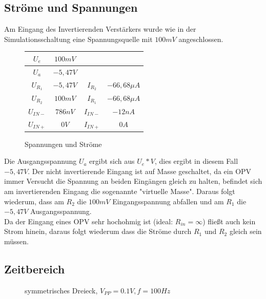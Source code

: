 \subsection{Str\"ome und Spannungen}
Am Eingang des Invertierenden Verst\"arkers wurde wie in der Simulationsschaltung eine Spannungsquelle mit $100mV$ angeschlossen.

\begin{figure}[H]
  \centering
  \begin{tabular}{c|c||c|c}
    $U_e$ & $100mV$ & & \\ \hline
    $U_a$ & $-5,47V$ & & \\ \hline
    $U_{R_1}$ & $-5,47V$ & $I_{R_2}$ & $-66,68\mu A$  \\ \hline
    $U_{R_2}$ & $100mV$ & $I_{R_1}$ & $-66,68\mu A$  \\ \hline
    $U_{IN-}$ & $786nV$ & $I_{IN-}$ & $-12nA$  \\ \hline
    $U_{IN+}$ & $0V$ & $I_{IN+}$ & $0A$
  \end{tabular}
  \caption{Spannungen und Str\"ome}
\end{figure}
\noindent
Die Ausgangsspannung $U_a$ ergibt sich aus $U_e*V$, dies ergibt in diesem Fall $-5,47V$. Der nicht invertierende Eingang ist auf Masse geschaltet, da ein OPV immer Versucht die Spannung an beiden Eing\"angen gleich zu halten, befindet sich am invertierenden Eingang die sogenannte "virtuelle Masse". Daraus folgt wiederum, dass am $R_2$ die $100mV$ Eingangsspannung abfallen und am $R_1$ die $-5,47V$ Ausgangsspannung.
\\ Da der Eingang eines OPV sehr hochohmig ist (ideal: $R_{in}=\infty$) flie\ss{}t auch kein Strom hinein,  daraus folgt wiederum dass die Str\"ome durch $R_1$ und $R_2$ gleich sein m\"ussen.

\subsection{Zeitbereich}
\begin{figure}[H]
  \centering
  \caption{symmetrisches Dreieck, $V_{PP}=0.1V, f=100Hz$}
\end{figure}

